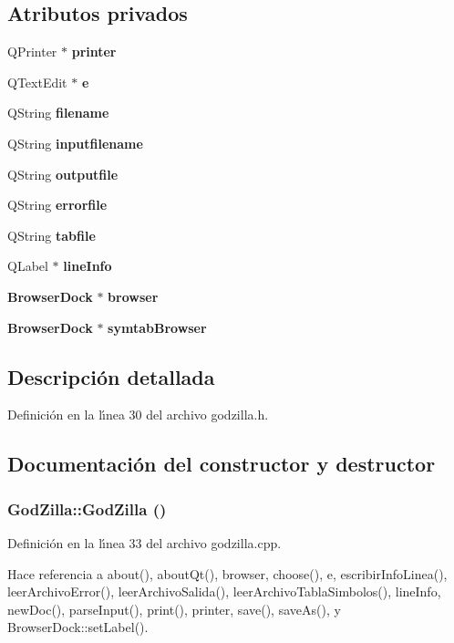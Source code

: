 \subsection*{Atributos privados}
\begin{CompactItemize}
\item 
QPrinter $\ast$ {\bf printer}
\item 
QText\-Edit $\ast$ {\bf e}
\item 
QString {\bf filename}
\item 
QString {\bf inputfilename}
\item 
QString {\bf outputfile}
\item 
QString {\bf errorfile}
\item 
QString {\bf tabfile}
\item 
QLabel $\ast$ {\bf line\-Info}
\item 
{\bf Browser\-Dock} $\ast$ {\bf browser}
\item 
{\bf Browser\-Dock} $\ast$ {\bf symtab\-Browser}
\end{CompactItemize}


\subsection{Descripci\'{o}n detallada}




Definici\'{o}n en la l\'{\i}nea 30 del archivo godzilla.h.

\subsection{Documentaci\'{o}n del constructor y destructor}
\subsubsection{\setlength{\rightskip}{0pt plus 5cm}God\-Zilla::God\-Zilla ()}\label{classGodZilla_a0}




Definici\'{o}n en la l\'{\i}nea 33 del archivo godzilla.cpp.

Hace referencia a about(), about\-Qt(), browser, choose(), e, escribir\-Info\-Linea(), leer\-Archivo\-Error(), leer\-Archivo\-Salida(), leer\-Archivo\-Tabla\-Simbolos(), line\-Info, new\-Doc(), parse\-Input(), print(), printer, save(), save\-As(), y Browser\-Dock::set\-Label().

